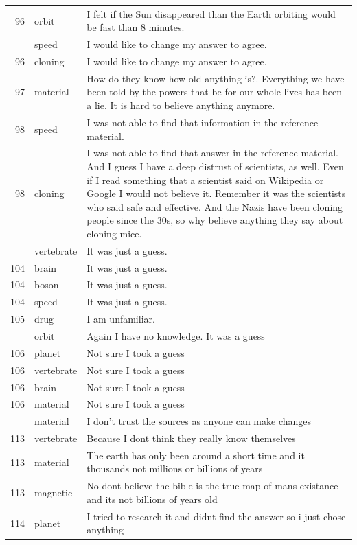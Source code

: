 \documentclass[
  doc,floatsintext]{apa6}
\begin{document}
\begin{longtable}[t]{>{}r>{}l>{\raggedright\arraybackslash}p{30em}}
96 & orbit & I felt if the Sun disappeared than the Earth orbiting would be fast than 8 minutes.\\
\addlinespace
96 & speed & I would like to change my answer to agree.\\
96 & cloning & I would like to change my answer to agree.\\
97 & material & How do they know how old anything is?.  Everything we have been told by the powers that be for our whole lives has been a lie.  It is hard to believe anything anymore.\\
98 & speed & I was not able to find that information in the reference material.\\
98 & cloning & I was not able to find that answer in the reference material. And I guess I have a deep distrust of scientists, as well. Even if I read something that a scientist said on Wikipedia or Google I would not believe it. Remember it was the scientists who said safe and effective. And the Nazis have been cloning people since the 30s, so why believe anything they say about cloning mice.\\
\addlinespace
104 & vertebrate & It was just a guess.\\
104 & brain & It was just a guess.\\
104 & boson & It was just a guess.\\
104 & speed & It was just a guess.\\
105 & drug & I am unfamiliar.\\
\addlinespace
105 & orbit & Again I have no knowledge. It was a guess\\
106 & planet & Not sure I took a guess\\
106 & vertebrate & Not sure I took a guess\\
106 & brain & Not sure I took a guess\\
106 & material & Not sure I took a guess\\
\addlinespace
108 & material & I don’t trust the sources as anyone can make changes\\
113 & vertebrate & Because I dont think they really know themselves\\
113 & material & The earth has only been around a short time and it thousands not millions or billions of years\\
113 & magnetic & No dont believe the bible is the true map of mans existance and its not billions of years old\\
114 & planet & I tried to research it and didnt find the answer so i just chose anything\\

\end{longtable}
\end{document}
